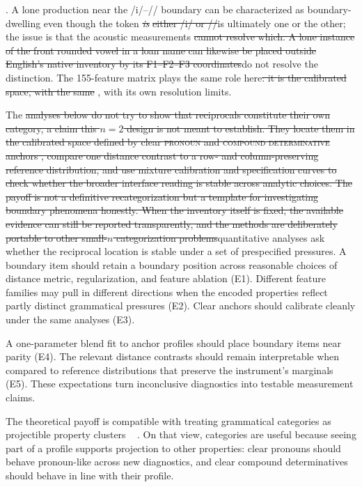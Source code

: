 \documentclass[12pt]{article}
\providecommand{\term}[1]{\textsc{#1}}
\providecommand{\DIFaddtex}[1]{{\protect\color{DIFgreen}#1}} %
\providecommand{\DIFdeltex}[1]{{\protect\color{red}\sout{#1}}}                      %
\providecommand{\DIFaddbegin}{} %
\providecommand{\DIFaddend}{} %
\providecommand{\DIFdelbegin}{} %
\providecommand{\DIFdelend}{} %
\providecommand{\DIFadd}[1]{\texorpdfstring{\DIFaddtex{#1}}{#1}} %
\providecommand{\DIFdel}[1]{\texorpdfstring{\DIFdeltex{#1}}{}} %
\newcommand{\DIFscaledelfig}{0.5}
\newlength{\DIFdelgraphicswidth} %
\newlength{\DIFdelgraphicsheight} %
\newcommand{\DIFaddincludegraphics}[2][]{{\color{DIFgreen}\fbox{\DIFOincludegraphics[#1]{#2}}}} %
\newcommand{\DIFdelincludegraphics}[2][]{%
\sbox{\DIFdelgraphicsbox}{\DIFOincludegraphics[#1]{#2}}%
\settoboxwidth{\DIFdelgraphicswidth}{\DIFdelgraphicsbox} %
\settoboxtotalheight{\DIFdelgraphicsheight}{\DIFdelgraphicsbox} %
\scalebox{\DIFscaledelfig}{%
\parbox[b]{\DIFdelgraphicswidth}{\usebox{\DIFdelgraphicsbox}\\[-\baselineskip] \rule{\DIFdelgraphicswidth}{0em}}\llap{\resizebox{\DIFdelgraphicswidth}{\DIFdelgraphicsheight}{%
\setlength{\unitlength}{\DIFdelgraphicswidth}%
\begin{picture}(1,1)%
\thicklines\linethickness{2pt} %
{\color[rgb]{1,0,0}\put(0,0){\framebox(1,1){}}}%
{\color[rgb]{1,0,0}\put(0,0){\line( 1,1){1}}}%
{\color[rgb]{1,0,0}\put(0,1){\line(1,-1){1}}}%
\end{picture}%
}\hspace*{3pt}}} %
} %
\DeclareRobustCommand{\DIFaddbegin}{\DIFOaddbegin \let\includegraphics\DIFaddincludegraphics} %
\DeclareRobustCommand{\DIFaddend}{\DIFOaddend \let\includegraphics\DIFOincludegraphics} %
\DeclareRobustCommand{\DIFdelbegin}{\DIFOdelbegin \let\includegraphics\DIFdelincludegraphics} %
\DeclareRobustCommand{\DIFdelend}{\DIFOaddend \let\includegraphics\DIFOincludegraphics} %
\begin{document}
\DIFdelend \DIFaddbegin \DIFadd{. }\DIFaddend A lone production near the /i/--// boundary can be characterized as boundary-dwelling even though the token \DIFdelbegin \emph{\DIFdel{is}} %
\DIFdel{either /i/ or //}\DIFdelend \DIFaddbegin \DIFadd{is ultimately one or the other}\DIFaddend ; the issue is that the acoustic measurements \DIFdelbegin \DIFdel{cannot resolve which. A lone instance of the front rounded vowel \textipa{[y]} in a loan name can likewise be placed outside English's native inventory by its F1--F2--F3 coordinates}\DIFdelend \DIFaddbegin \DIFadd{do not resolve the distinction}\DIFaddend . The 155-feature matrix plays the same role here\DIFdelbegin \DIFdel{: it is the calibrated space, with the same }\DIFdelend \DIFaddbegin \DIFadd{, with its own }\DIFaddend resolution limits.

The \DIFdelbegin \DIFdel{analyses below do not try to show that reciprocals constitute their own category, a claim this $n=2$ design is not meant to establish. They locate them in the calibrated space defined by clear \term{pronoun} and \term{compound determinative} anchors , compare one distance contrast to a row- and column-preserving reference distribution, and use mixture calibration and specification curves to check whether the broader interface reading is stable across analytic choices. The payoff is not a definitive recategorization but a template for investigating boundary phenomena honestly. When the inventory itself is fixed, the available evidence can still be reported transparently, and the methods are deliberately portable to other small-$n$ categorization problems}\DIFdelend \DIFaddbegin \DIFadd{quantitative analyses ask whether the reciprocal location is stable under a set of prespecified pressures. A boundary item should retain a boundary position across reasonable choices of distance metric, regularization, and feature ablation (E1). Different feature families may pull in different directions when the encoded properties reflect partly distinct grammatical pressures (E2). Clear anchors should calibrate cleanly under the same analyses (E3).
}

\DIFadd{A one-parameter blend fit to anchor profiles should place boundary items near parity (E4). The relevant distance contrasts should remain interpretable when compared to reference distributions that preserve the instrument's marginals (E5). These expectations turn inconclusive diagnostics into testable measurement claims.
}

\DIFadd{The theoretical payoff is compatible with treating grammatical categories as projectible property clusters \mbox{%
\parencite{miller2021}}\hskip0pt%
. On that view, categories are useful because seeing part of a profile supports projection to other properties: clear pronouns should behave pronoun-like across new diagnostics, and clear compound determinatives should behave in line with their profile}\DIFaddend .
\end{document}
